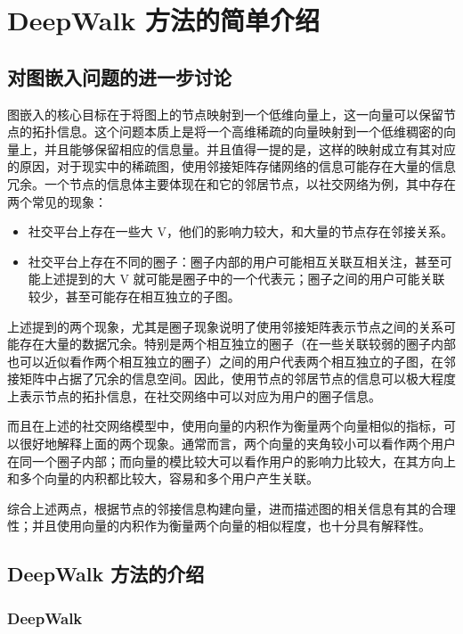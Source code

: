 \documentclass{ctexart}
\begin{document}
\section{DeepWalk 方法的简单介绍}

\subsection{对图嵌入问题的进一步讨论}

图嵌入的核心目标在于将图上的节点映射到一个低维向量上，这一向量可以保留节点的拓扑信息。这个问题本质上是将一个高维稀疏的向量映射到一个低维稠密的向量上，并且能够保留相应的信息量。并且值得一提的是，这样的映射成立有其对应的原因，对于现实中的稀疏图，使用邻接矩阵存储网络的信息可能存在大量的信息冗余。一个节点的信息体主要体现在和它的邻居节点，以社交网络为例，其中存在两个常见的现象：

\begin{itemize}
    \item 社交平台上存在一些大 V，他们的影响力较大，和大量的节点存在邻接关系。
    \item 社交平台上存在不同的圈子：圈子内部的用户可能相互关联互相关注，甚至可能上述提到的大 V 就可能是圈子中的一个代表元；圈子之间的用户可能关联较少，甚至可能存在相互独立的子图。
\end{itemize}

上述提到的两个现象，尤其是圈子现象说明了使用邻接矩阵表示节点之间的关系可能存在大量的数据冗余。特别是两个相互独立的圈子（在一些关联较弱的圈子内部也可以近似看作两个相互独立的圈子）之间的用户代表两个相互独立的子图，在邻接矩阵中占据了冗余的信息空间。因此，使用节点的邻居节点的信息可以极大程度上表示节点的拓扑信息，在社交网络中可以对应为用户的圈子信息。

而且在上述的社交网络模型中，使用向量的内积作为衡量两个向量相似的指标，可以很好地解释上面的两个现象。通常而言，两个向量的夹角较小可以看作两个用户在同一个圈子内部；而向量的模比较大可以看作用户的影响力比较大，在其方向上和多个向量的内积都比较大，容易和多个用户产生关联。

综合上述两点，根据节点的邻接信息构建向量，进而描述图的相关信息有其的合理性；并且使用向量的内积作为衡量两个向量的相似程度，也十分具有解释性。

\subsection{DeepWalk 方法的介绍}

\subsubsection{DeepWalk}
\end{document}
